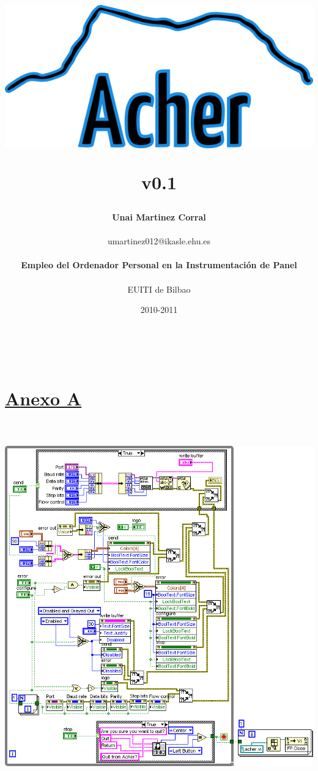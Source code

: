 \documentclass[a4paper,titlepage,10pt,oneside]{article}
\title{
\begin{center}
 \includegraphics[width=400pt]{./images/acher_logo.png}
\end{center}
\vspace{2.5cm}
\Huge{v0.1}
\vspace{1cm}
}
\author{
\LARGE{\textbf{Unai Martinez Corral}} \\
\\
\large{umartinez012@ikasle.ehu.es} \\
\vspace{1cm} \\
\large{\textbf{Empleo del Ordenador Personal en la Instrumentación de Panel}}\\
\\
\large{EUITI de Bilbao}
\vspace{2.25cm}
}
\date{\LARGE{2010-2011}}
\begin{document}
\maketitle


\tableofcontents

\newpage

\listoffigures

\listoftables


\newpage


\newpage


\newpage


\newpage


\newpage


\fancyfoot[C]{}

\newpage
\begin{center}
 \textcolor{White}{.} \\
 \vspace{9cm}
 \section*{\Huge{\textbf{\underline{Anexo A}}}}\label{anexoa}
\end{center}

\newpage
  \textcolor{White}{.} \\
  \vspace{3cm} \\
  \includegraphics[width=400pt]{./images/acher_labview.png}
\end{document}
